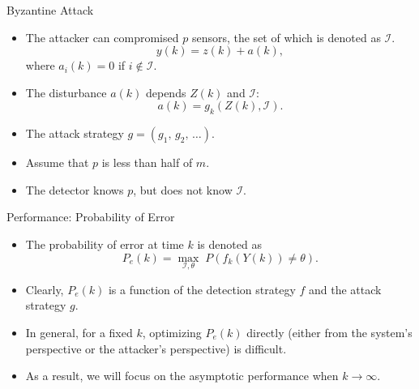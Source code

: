 \documentclass[10pt]{beamer}
\newlength\figureheight
\newlength\figurewidth
\newcommand{\tikzdir}[1]{#1.tikz}
\newcommand{\inputtikz}[1]{}}
\begin{document}
\begin{frame}{Byzantine Attack}
  \begin{itemize}
  \item The attacker can compromised $p$ sensors, the set of which is denoted as $\mathcal I$. 
    \begin{displaymath}
      y(k) = z(k) + a(k),  
    \end{displaymath}
    where $a_i(k) = 0$ if $i\notin \mathcal I$.
    \begin{center}
      \setlength{\figureheight}{2cm}
      \setlength{\figurewidth}{10cm}
      \inputtikz{blockdiagram}
    \end{center}
  \item The disturbance $a(k)$ depends $ Z(k)$ and $\mathcal I$: 
    \begin{displaymath}
      a(k) = g_k( Z(k),\mathcal I). 
    \end{displaymath}
  \item The attack strategy $g = (g_1,\,g_2,\,\dots)$.
  \item Assume that $p$ is less than half of $m$.
  \item The detector knows $p$, but does not know $\mathcal I$.
  \end{itemize}
\end{frame}

\begin{frame}{Performance: Probability of Error}
  \begin{itemize}
  \item The probability of error at time $k$ is denoted as
    \begin{displaymath}
      P_e(k) = \max_{\mathcal I,\theta}\; P(f_k(Y(k)) \neq \theta). 
    \end{displaymath}
  \item Clearly, $P_e(k)$ is a function of the detection strategy $f$ and the attack strategy $g$.
  \item  In general, for a fixed $k$, optimizing $P_e(k)$ directly (either from the system's perspective or the attacker's perspective) is difficult.
  \item As a result, we will focus on the asymptotic performance when $k\rightarrow\infty$.
  \end{itemize}
\end{frame}
\end{document}
